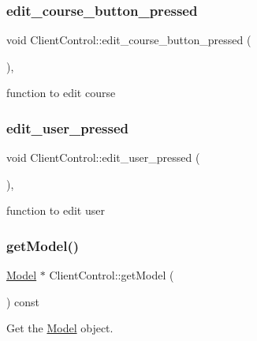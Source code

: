 \subsubsection{\texorpdfstring{edit\+\_\+course\+\_\+button\+\_\+pressed}{edit\_course\_button\_pressed}}
{\footnotesize\ttfamily void Client\+Control\+::edit\+\_\+course\+\_\+button\+\_\+pressed (\begin{DoxyParamCaption}{ }\end{DoxyParamCaption})\hspace{0.3cm}{\ttfamily [private]}, {\ttfamily [slot]}}



function to edit course 

\mbox{\label{classClientControl_a2c9466ca951a1b8c32f24e4ab1389ba5}} 
\subsubsection{\texorpdfstring{edit\+\_\+user\+\_\+pressed}{edit\_user\_pressed}}
{\footnotesize\ttfamily void Client\+Control\+::edit\+\_\+user\+\_\+pressed (\begin{DoxyParamCaption}{ }\end{DoxyParamCaption})\hspace{0.3cm}{\ttfamily [private]}, {\ttfamily [slot]}}



function to edit user 

\mbox{\label{classClientControl_aefc43486831b9e545a678abae5c592ca}} 
\subsubsection{\texorpdfstring{get\+Model()}{getModel()}}
{\footnotesize\ttfamily \hyperlink{classModel}{Model} $\ast$ Client\+Control\+::get\+Model (\begin{DoxyParamCaption}{ }\end{DoxyParamCaption}) const}



Get the \hyperlink{classModel}{Model} object. 

